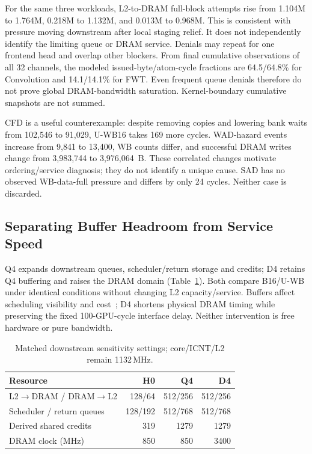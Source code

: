\documentclass[conference,letterpaper]{IEEEtran}
\begin{document}
For the same three workloads, L2-to-DRAM full-block attempts rise from 1.104M to 1.764M, 0.218M to 1.132M, and 0.013M to 0.968M. This is consistent with pressure moving downstream after local staging relief. It does not independently identify the limiting queue or DRAM service. Denials may repeat for one frontend head and overlap other blockers. From final cumulative observations of all 32 channels, the modeled issued-byte/atom-cycle fractions are 64.5/64.8\% for Convolution and 14.1/14.1\% for FWT. Even frequent queue denials therefore do not prove global DRAM-bandwidth saturation. Kernel-boundary cumulative snapshots are not summed.

CFD is a useful counterexample: despite removing copies and lowering bank waits from 102,546 to 91,029, U-WB16 takes 169 more cycles. WAD-hazard events increase from 9,841 to 13,400, WB counts differ, and successful DRAM writes change from 3,983,744 to 3,976,064~B. These correlated changes motivate ordering/service diagnosis; they do not identify a unique cause. SAD has no observed WB-data-full pressure and differs by only 24 cycles. Neither case is discarded.



\subsection{Separating Buffer Headroom from Service Speed}
Q4 expands downstream queues, scheduler/return storage and credits; D4 retains Q4 buffering and raises the DRAM domain (Table~\ref{tab:headroom}). Both compare B16/U-WB under identical conditions without changing L2 capacity/service. Buffers affect scheduling visibility and cost~\cite{sms}; D4 shortens physical DRAM timing while preserving the fixed 100-GPU-cycle interface delay. Neither intervention is free hardware or pure bandwidth.

\begin{table}[t]
\caption{Matched downstream sensitivity settings; core/ICNT/L2 remain 1132\,MHz.}
\label{tab:headroom}\centering\footnotesize
\begin{tabular}{@{}lrrr@{}}
\toprule
Resource & H0 & Q4 & D4 \\
\midrule
L2$\to$DRAM / DRAM$\to$L2 & 128/64 & 512/256 & 512/256 \\
Scheduler / return queues & 128/192 & 512/768 & 512/768 \\
Derived shared credits & 319 & 1279 & 1279 \\
DRAM clock (MHz) & 850 & 850 & 3400 \\
\bottomrule
\end{tabular}
\end{table}
\end{document}
